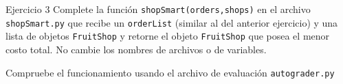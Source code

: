 \documentclass[10pt]{beamer}
\newcommand{\themename}{\textbf{\textsc{metropolis}}\xspace}
\begin{document}
\begin{frame}[fragile]{Ejercicio 3}
Complete la función \texttt{shopSmart(orders,shops)} en el archivo \texttt{shopSmart.py}
que recibe un \texttt{orderList} (similar al del anterior ejercicio) y una lista 
de objetos \texttt{FruitShop} y retorne el objeto \texttt{FruitShop} que posea el menor costo 
total. No cambie los nombres de archivos o de variables.

Compruebe el funcionamiento usando el archivo de evaluación \texttt{autograder.py}

\end{frame}

\appendix



\end{document}
